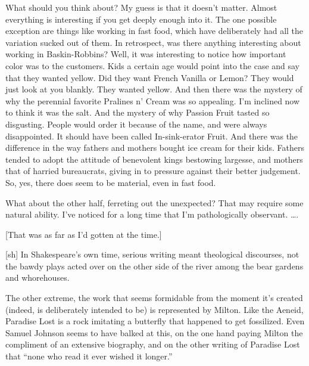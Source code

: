 What should you think about? My guess is that it doesn't matter. Almost
everything is interesting if you get deeply enough into it. The one
possible exception are things like working in fast food, which have
deliberately had all the variation sucked out of them. In retrospect,
was there anything interesting about working in Baskin-Robbins? Well, it
was interesting to notice how important color was to the customers. Kids
a certain age would point into the case and say that they wanted yellow.
Did they want French Vanilla or Lemon? They would just look at you
blankly. They wanted yellow. And then there was the mystery of why the
perennial favorite Pralines n' Cream was so appealing. I'm inclined now
to think it was the salt. And the mystery of why Passion Fruit tasted so
disgusting. People would order it because of the name, and were always
disappointed. It should have been called In-sink-erator Fruit. And there
was the difference in the way fathers and mothers bought ice cream for
their kids. Fathers tended to adopt the attitude of benevolent kings
bestowing largesse, and mothers that of harried bureaucrats, giving in
to pressure against their better judgement. So, yes, there does seem to
be material, even in fast food.

What about the other half, ferreting out the unexpected? That may
require some natural ability. I've noticed for a long time that I'm
pathologically observant. \ldots.

{[}That was as far as I'd gotten at the time.{]}


{[}sh{]} In Shakespeare's own time, serious writing meant theological
discourses, not the bawdy plays acted over on the other side of the
river among the bear gardens and whorehouses.

The other extreme, the work that seems formidable from the moment it's
created (indeed, is deliberately intended to be) is represented by
Milton. Like the Aeneid, Paradise Lost is a rock imitating a butterfly
that happened to get fossilized. Even Samuel Johnson seems to have
balked at this, on the one hand paying Milton the compliment of an
extensive biography, and on the other writing of Paradise Lost that
``none who read it ever wished it longer.''